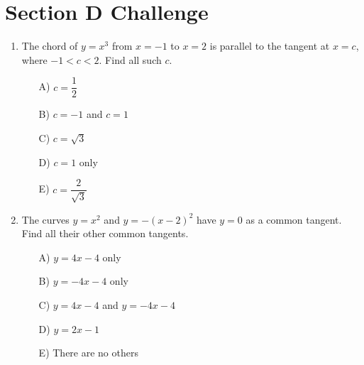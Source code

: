 \documentclass[11pt,a4paper]{article}
\newlength{\ipadheight}
\renewcommand{\ans}[1]{%
  \par\noindent
  \begin{minipage}[t][\ipadheight][t]{\linewidth}%
    \raggedleft\vspace*{\fill}%
    {\fontsize{4}{5}\selectfont\color{black!22}\rotatebox{180}{Ans:~#1}}%
  \end{minipage}%
  \par\vspace{4pt}}
\renewcommand{\method}[1]{}
\renewcommand{\inv}[1]{}
\begin{document}
\section*{Section D \quad Challenge}
\begin{enumerate}

\needspace{12cm}
\item The chord of $y=x^3$ from $x=-1$ to $x=2$ is parallel to the tangent at $x=c$, where $-1<c<2$. Find all such $c$.
\begin{itemize}
\item[A)] $c=\dfrac12$
\item[B)] $c=-1$ and $c=1$
\item[C)] $c=\sqrt3$
\item[D)] $c=1$ only
\item[E)] $c=\dfrac{2}{\sqrt3}$
\end{itemize}

\ans{D) $c=1$ only}
\method{Chord gradient: $\dfrac{8-(-1)}{2-(-1)}=\dfrac93=3$. A tangent of gradient $3$ needs $3c^2=3$, so $c=\pm1$. The condition $-1<c<2$ is strict, so $c=-1$ is excluded and $c=1$ is the only value. Decoys: A uses the midpoint $\frac12$, which is valid only for quadratics; B ignores the strict inequality; C forgets to divide the rise $9$ by the run $3$, solving $3c^2=9$; E uses the chord from $x=0$, whose gradient is $4$, giving $c=\frac{2}{\sqrt3}$.}
\inv{The value $c=-1$ also gives gradient $3$. Show the chord's line $y=3x+2$ is actually the tangent at $x=-1$, since $x^3-3x-2=(x+1)^2(x-2)$. Prove that for any quadratic the parallel tangent is always at the midpoint, then find where it is for $y=x^3$ on $[0,h]$.}

\needspace{12cm}
\item The curves $y=x^2$ and $y=-(x-2)^2$ have $y=0$ as a common tangent. Find all their other common tangents.
\begin{itemize}
\item[A)] $y=4x-4$ only
\item[B)] $y=-4x-4$ only
\item[C)] $y=4x-4$ and $y=-4x-4$
\item[D)] $y=2x-1$
\item[E)] There are no others
\end{itemize}


\end{enumerate}
\end{document}
